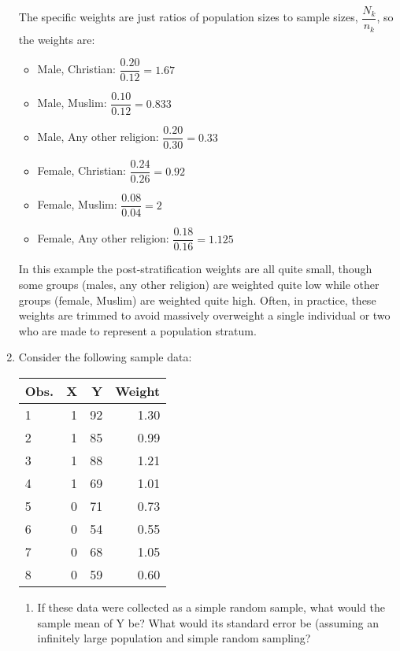 \documentclass[a4paper]{exam}
\begin{document}
\begin{enumerate}
\begin{solution}
The specific weights are just ratios of population sizes to sample sizes, $\dfrac{N_k}{n_k}$, so the weights are:

\begin{itemize}
\item Male, Christian: $\dfrac{0.20}{0.12} = 1.67$
\item Male, Muslim: $\dfrac{0.10}{0.12} = 0.833$
\item Male, Any other religion: $\dfrac{0.20}{0.30} = 0.33$
\item Female, Christian: $\dfrac{0.24}{0.26} = 0.92$
\item Female, Muslim: $\dfrac{0.08}{0.04} = 2$
\item Female, Any other religion: $\dfrac{0.18}{0.16} = 1.125$
\end{itemize}

In this example the post-stratification weights are all quite small, though some groups (males, any other religion) are weighted quite low while other groups (female, Muslim) are weighted quite high. Often, in practice, these weights are trimmed to avoid massively overweight a single individual or two who are made to represent a population stratum.

\end{solution}

\item Consider the following sample data:

\begin{center}
\begin{tabular}{lrrr}
Obs. & X & Y & Weight\\ \midrule
1 & 1 & 92 & 1.30\\
2 & 1 & 85 & 0.99\\
3 & 1 & 88 & 1.21\\
4 & 1 & 69 & 1.01\\
5 & 0 & 71 & 0.73\\
6 & 0 & 54 & 0.55\\
7 & 0 & 68 & 1.05\\
8 & 0 & 59 & 0.60\\
\end{tabular}
\end{center}


	\begin{enumerate}
	\item If these data were collected as a simple random sample, what would the  sample mean of Y be? What would its standard error be (assuming an infinitely large population and simple random sampling?
	

\end{enumerate}
\end{enumerate}
\end{document}
